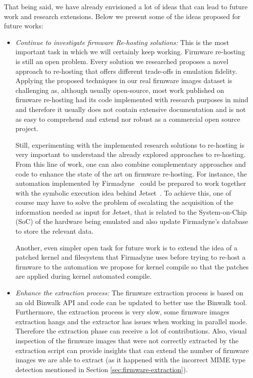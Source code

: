 That being said, we have already envisioned a lot of ideas that can lead to future work and research extensions. Below we present some of the ideas proposed for future works:

\begin{itemize}
    \item \textit{Continue to investigate firmware Re-hosting solutions:} This is the most important task in which we will certainly keep working. Firmware re-hosting is still an open problem. Every solution we researched proposes a novel approach to re-hosting that offers different trade-offs in emulation fidelity. Applying the proposed techniques in our real firmware images dataset is challenging as, although usually open-source, most work published on firmware re-hosting had its code implemented with research purposes in mind and therefore it usually does not contain extensive documentation and is not as easy to comprehend and extend nor robust as a commercial open source project.
    
    Still, experimenting with the implemented research solutions to re-hosting is very important to understand the already explored approaches to re-hosting. From this line of work, one can also combine complementary approaches and code to enhance the state of the art on firmware re-hosting. For instance, the automation implemented by Firmadyne~\cite{firmadyne} could be prepared to work together with the symbolic execution idea behind Jetset~\cite{jetset}. To achieve this, one of course may have to solve the problem of escalating the acquisition of the information needed as input for Jetset, that is related to the System-on-Chip (SoC) of the hardware being emulated and also update Firmadyne's database to store the relevant data.
    
    Another, even simpler open task for future work is to extend the idea of a patched kernel and filesystem that Firmadyne uses before trying to re-host a firmware to the automation we propose for kernel compile so that the patches are applied during kernel automated compile.
    
    \item \textit{Enhance the extraction process:} The firmware extraction process is based on an old Binwalk API and code can be updated to better use the Binwalk tool. Furthermore, the extraction process is very slow, some firmware images extraction hangs and the extractor has issues when working in parallel mode. Therefore the extraction phase can receive a lot of contributions. Also, visual inspection of the firmware images that were not correctly extracted by the extraction script can provide insights that can extend the number of firmware images we are able to extract (as it happened with the incorrect MIME type detection mentioned in Section \ref{sec:firmware-extraction}).
    

\end{itemize}
